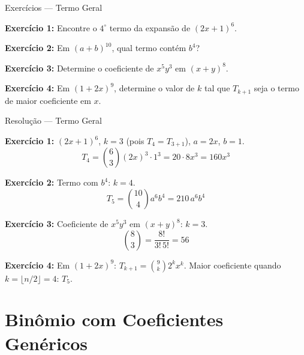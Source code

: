\documentclass[9pt]{beamer}
\begin{document}

\begin{frame}{Exercícios — Termo Geral}

\textbf{Exercício 1:} Encontre o $4^\circ$ termo da expansão de $(2x + 1)^6$.

\vspace{0.4cm}

\textbf{Exercício 2:} Em $(a + b)^{10}$, qual termo contém $b^4$?

\vspace{0.4cm}

\textbf{Exercício 3:} Determine o coeficiente de $x^5 y^3$ em $(x+y)^8$.

\vspace{0.4cm}

\textbf{Exercício 4:} Em $(1 + 2x)^9$, determine o valor de $k$ tal que $T_{k+1}$ seja o termo de maior coeficiente em $x$.
\end{frame}


\begin{frame}{Resolução — Termo Geral}

\textbf{Exercício 1:} $(2x+1)^6$, $k=3$ (pois $T_4 = T_{3+1}$), $a=2x$, $b=1$.
\[
T_4 = \binom{6}{3}(2x)^3 \cdot 1^3 = 20 \cdot 8x^3 = 160x^3
\]

\vspace{0.3cm}

\textbf{Exercício 2:} Termo com $b^4$: $k=4$.
\[
T_5 = \binom{10}{4} a^6 b^4 = 210\, a^6 b^4
\]

\vspace{0.3cm}

\textbf{Exercício 3:} Coeficiente de $x^5 y^3$ em $(x+y)^8$: $k=3$.
\[
\binom{8}{3} = \frac{8!}{3!\,5!} = 56
\]

\vspace{0.3cm}

\textbf{Exercício 4:} Em $(1+2x)^9$: $T_{k+1} = \binom{9}{k}2^k x^k$. Maior coeficiente quando $k = \lfloor n/2 \rfloor = 4$: $T_5$.
\end{frame}

\section{Binômio com Coeficientes Genéricos}
\end{document}
